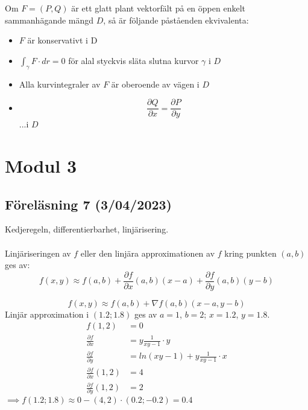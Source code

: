\documentclass{report}
\begin{document}
\vspace{20pt}

\thm{}
{
Om $ F = (P,Q)	$ är ett glatt plant vektorfält på en öppen enkelt sammanhägande mängd $ D $, så är följande påståenden ekvivalenta:
\begin{itemize}
	\item $ F $ är konservativt i D
	\item $ \int_{ \gamma}^{} F \cdot dr = 0$ för alal styckvis släta slutna kurvor $ \gamma $ i $ D $ 
	\item Alla kurvintegraler av $ F $ är oberoende av vägen i $ D $
	\item
	\begin{equation*}
	\frac{\partial Q }{\partial x } = \frac{\partial P }{\partial y }
	\end{equation*}
	...i $ D $ 
\end{itemize}
}

\pagebreak
\chapter{Modul 3}
\section{Föreläsning 7 (3/04/2023)}
Kedjeregeln, differentierbarhet, linjärisering.\\\\

{
Linjäriseringen av $ f $ eller den linjära approximationen av $ f $ kring punkten $ (a,b) $ ges av:
\begin{equation*}
f(x,y) \approx f(a,b) + \frac{\partial f }{\partial x } (a,b)(x-a) + \frac{\partial f }{\partial y } (a,b)(y-b)
\end{equation*}
}

{
\begin{equation*}
f(x,y) \approx f(a,b) + \nabla f(a,b)(x-a,y-b)
\end{equation*}
Linjär approximation i $ (1.2;1.8) $ ges av $ a = 1 $, $ b = 2 $; $ x = 1.2 $, $ y = 1.8 $.
\begin{align*}
	f(1,2) &= 0\\
	\frac{\partial f }{\partial x } &= y \frac{1}{xy-1} \cdot y\\
	\frac{\partial f }{\partial y } &= ln(xy-1) + y \frac{1}{xy-1} \cdot x\\
	\frac{\partial f }{\partial x } (1,2) &= 4\\
	\frac{\partial f }{\partial y }(1,2) &= 2
\end{align*}
$ \implies f(1.2;1.8) \approx 0 - (4,2) \cdot (0.2;-0.2) = 0.4 $ 
}
\end{document}
